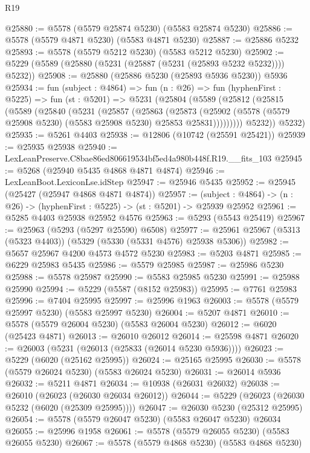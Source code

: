 \begin{lexlean}{R19}
\begin{coremodule}
@25880 := @5578 (@5579 @25874 @5230) (@5583 @25874 @5230)
@25886 := @5578 (@5579 @4871 @5230) (@5583 @4871 @5230)
@25887 := @25886 @5232
@25893 := @5578 (@5579 @5212 @5230) (@5583 @5212 @5230)
@25902 := @5229 (@5589 (@25880 (@5231 (@25887 (@5231 (@25893 @5232 @5232)))) @5232))
@25908 := @25880 (@25886 @5230 (@25893 @5936 @5230)) @5936
@25934 := fun (subject : @4864) =>
  fun (n : @26) =>
  fun (hyphenFirst : @5225) =>
  fun (st : @5201) =>
  @5231
    (@25804
      (@5589
        (@25812
          (@25815
            (@5589
              (@25840
                (@5231
                  (@25857
                    (@25863
                      (@25873
                        (@25902
                          (@5578 (@5579 @25908 @5230) (@5583 @25908 @5230) @25853 @25831)))))))))
          @5232))
      @5232)
@25935 := @5261 @4403
@25938 := @12806 (@10742 (@25591 @25421))
@25939 := @25935 @25938
@25940 := LexLeanPreserve.C8bae86ed806619534bf5ed4a980b448f.R19.__fits_103
@25945 := @5268 (@25940 @5435 @4868 @4871 @4874)
@25946 := LexLeanBoot.LexiconLse.idStep
@25947 := @25946 @5435
@25952 := @25945 (@25427 (@25947 @4868 @4871 @4874))
@25957 := (subject : @4864) -> (n : @26) -> (hyphenFirst : @5225) -> (st : @5201) -> @25939 @25952
@25961 := @5285 @4403 @25938 @25952 @4576
@25963 := @5293 (@5543 @25419)
@25967 := @25963 (@5293 (@5297 @25590) @6508)
@25977 := @25961 @25967 (@5313 (@5323 @4403)) (@5329 (@5330 (@5331 @4576) @25938 @5306))
@25982 := @5657 @25967 @4200 @4573 @4572 @5230
@25983 := @5203 @4871
@25985 := @6229 @25983 @5435
@25986 := @5579 @25985
@25987 := @25986 @5230
@25988 := @5578 @25987
@25990 := @5583 @25985 @5230
@25991 := @25988 @25990
@25994 := @5229 (@5587 (@8152 @25983))
@25995 := @7761 @25983
@25996 := @7404 @25995
@25997 := @25996 @1963
@26003 := @5578 (@5579 @25997 @5230) (@5583 @25997 @5230)
@26004 := @5207 @4871
@26010 := @5578 (@5579 @26004 @5230) (@5583 @26004 @5230)
@26012 := @6020 (@25423 @4871)
@26013 := @26010 @26012
@26014 := @25598 @4871
@26020 := @26003 (@5231 (@26013 (@25833 (@26014 @5230 @5936))))
@26023 := @5229 (@6020 (@25162 @25995))
@26024 := @25165 @25995
@26030 := @5578 (@5579 @26024 @5230) (@5583 @26024 @5230)
@26031 := @26014 @5936
@26032 := @5211 @4871
@26034 := @10938 (@26031 @26032)
@26038 := @26010 (@26023 (@26030 @26034 @26012))
@26044 := @5229 (@26023 (@26030 @5232 (@6020 (@25309 @25995))))
@26047 := @26030 @5230 (@25312 @25995)
@26054 := @5578 (@5579 @26047 @5230) (@5583 @26047 @5230) @26034
@26055 := @25996 @1958
@26061 := @5578 (@5579 @26055 @5230) (@5583 @26055 @5230)
@26067 := @5578 (@5579 @4868 @5230) (@5583 @4868 @5230)

\end{coremodule}
\end{lexlean}

